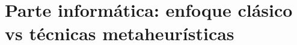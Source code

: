 ﻿\documentclass[a4paper,11pt]{article}
\begin{document}

%
\tableofcontents
\newpage
%
\setcounter{page}{1}
\setcounter{section}{0}
%


\newpage

\vspace{4cm}

\newpage 










\newpage

\part{Parte informática: enfoque clásico vs técnicas metaheurísticas}

\vspace{4cm}

\newpage














\end{document}

